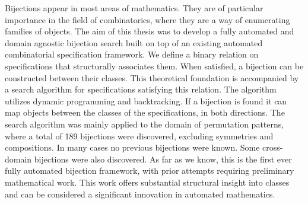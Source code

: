 Bijections appear in most areas of mathematics. They are of particular importance in the field of combinatorics, where they are a way of enumerating families of objects. The aim of this thesis was to develop a fully automated and domain agnostic bijection search built on top of an existing automated combinatorial specification framework. We define a binary relation on specifications that structurally associates them. When satisfied, a bijection can be constructed between their classes. This theoretical foundation is accompanied by a search algorithm for specifications satisfying this relation. The algorithm utilizes dynamic programming and backtracking. If a bijection is found it can map objects between the classes of the specifications, in both directions. The search algorithm was mainly applied to the domain of permutation patterns, where a total of 189 bijections were discovered, excluding symmetries and compositions. In many cases no previous bijections were known. Some cross-domain bijections were also discovered. As far as we know, this is the first ever fully automated bijection framework, with prior attempts requiring preliminary mathematical work. This work offers substantial structural insight into classes and can be considered a significant innovation in automated mathematics.